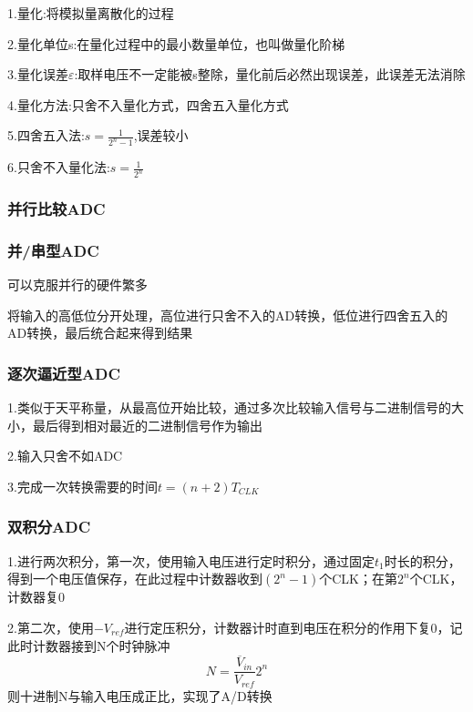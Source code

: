 \documentclass[11pt,twoside,a4paper]{ctexart}
\begin{document}
1.量化:将模拟量离散化的过程

2.量化单位s:在量化过程中的最小数量单位，也叫做量化阶梯

3.量化误差$\varepsilon $:取样电压不一定能被s整除，量化前后必然出现误差，此误差无法消除

4.量化方法:只舍不入量化方式，四舍五入量化方式

5.四舍五入法:$s = \frac{1}{2^n - 1}$,误差较小

6.只舍不入量化法:$s = \frac{1}{2^n}$

\subsubsection{并行比较ADC}

\subsubsection{并/串型ADC}

可以克服并行的硬件繁多

将输入的高低位分开处理，高位进行只舍不入的AD转换，低位进行四舍五入的AD转换，最后统合起来得到结果

\subsubsection{逐次逼近型ADC}

1.类似于天平称量，从最高位开始比较，通过多次比较输入信号与二进制信号的大小，最后得到相对最近的二进制信号作为输出

2.输入只舍不如ADC

3.完成一次转换需要的时间$t = (n + 2)T_{CLK}$

\subsubsection{双积分ADC}

1.进行两次积分，第一次，使用输入电压进行定时积分，通过固定$t_1$时长的积分，得到一个电压值保存，在此过程中计数器收到$(2^n - 1)$个CLK；在第$2^n$个CLK，计数器复0

2.第二次，使用$-V_{ref}$进行定压积分，计数器计时直到电压在积分的作用下复0，记此时计数器接到N个时钟脉冲
\[N = \frac{\overline{V}_{in}}{V_{ref}}2^n\]
则十进制N与输入电压成正比，实现了A/D转换
\end{document}
